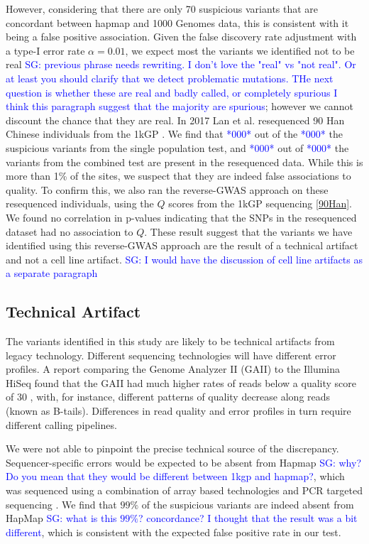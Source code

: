 \documentclass[9pt,lineno]{elife}
\newcommand{\sgcomment}[1]{\textcolor{blue}{SG: #1}}
\newcommand{\todo}[1]{\textcolor{blue}{*#1*}}
\begin{document}
However, considering that there are only 70 suspicious variants that are concordant between hapmap and 1000 Genomes data, this is consistent with it being a false positive association.
Given the false discovery rate adjustment with a type-I error rate $\alpha = 0.01$, we expect most the variants we identified not to be real \sgcomment{previous phrase needs rewriting. I don't love the "real" vs "not real". Or at least you should clarify that we detect problematic mutations. THe next question is whether these are real and badly called, or completely spurious I think this paragraph suggest that the majority are spurious}; however we cannot discount the chance that they are real.
In 2017 Lan et al. resequenced 90 Han Chinese individuals from the 1kGP \citep{Lan2017}. 
We find that \todo{000} out of the \todo{000} the suspicious variants from the single population test, and \todo{000} out of \todo{000} the variants from the combined test are present in the resequenced data.
While this is more than 1\% of the sites, we suspect that they are indeed false associations to quality.
To confirm this, we also ran the reverse-GWAS approach on these resequenced individuals, using the $Q$ scores from the 1kGP sequencing \ref{90Han}.
We found no correlation in p-values indicating that the SNPs in the resequenced dataset had no association to $Q$.
These result suggest that the variants we have identified using this reverse-GWAS approach are the result of a technical artifact and not a cell line artifact. \sgcomment{I would have the discussion of cell line artifacts as a separate paragraph}

\subsection{Technical Artifact}
The variants identified in this study are likely to be technical artifacts from legacy technology.
Different sequencing technologies will have different error profiles. 
A report comparing the Genome Analyzer II (GAII) to the Illumina HiSeq found that the GAII had much higher rates of reads below a quality score of 30 \citep{Minoche2011}, with, for instance, different patterns of quality decrease along reads (known as B-tails). 
Differences in read quality and error profiles in turn require different calling pipelines.

We were not able to pinpoint the precise technical source of the discrepancy. 
Sequencer-specific errors would be expected to be absent from Hapmap \sgcomment{why? Do you mean that they would be different between 1kgp and hapmap?}, which was sequenced using a combination of array based technologies and PCR targeted sequencing \citep{HapMap2005}. 
We find that $99\%$ of the suspicious variants are indeed absent from HapMap \sgcomment{what is this $99\%$? concordance? I thought that the result was a bit different}, which is consistent with the expected false positive rate in our test.
  
\end{document}
